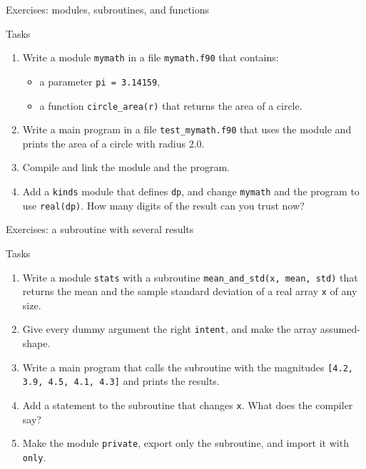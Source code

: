 \begin{frame}{Exercises: modules, subroutines, and functions}
  \begin{block}{Tasks}
    \begin{enumerate}
      \item Write a module \texttt{mymath} in a file \texttt{mymath.f90} that contains:
        \begin{itemize}
          \item a parameter \texttt{pi = 3.14159},
          \item a function \texttt{circle\_area(r)} that returns the area of a circle.
        \end{itemize}
      \item Write a main program in a file \texttt{test\_mymath.f90} that uses the module and prints the area of a circle with radius 2.0.
      \item Compile and link the module and the program.
      \item Add a \texttt{kinds} module that defines \texttt{dp}, and change \texttt{mymath} and the program to use \texttt{real(dp)}. How many digits of the result can you trust now?
    \end{enumerate}
  \end{block}
\end{frame}


\begin{frame}{Exercises: a subroutine with several results}
  \begin{block}{Tasks}
    \begin{enumerate}
      \item Write a module \texttt{stats} with a subroutine \texttt{mean\_and\_std(x, mean, std)} that returns the mean and the sample standard deviation of a real array \texttt{x} of any size.
      \item Give every dummy argument the right \texttt{intent}, and make the array assumed-shape.
      \item Write a main program that calls the subroutine with the magnitudes \mbox{\texttt{[4.2, 3.9, 4.5, 4.1, 4.3]}} and prints the results.
      \item Add a statement to the subroutine that changes \texttt{x}. What does the compiler say?
      \item Make the module \texttt{private}, export only the subroutine, and import it with \texttt{only}.
    \end{enumerate}
  \end{block}
\end{frame}


